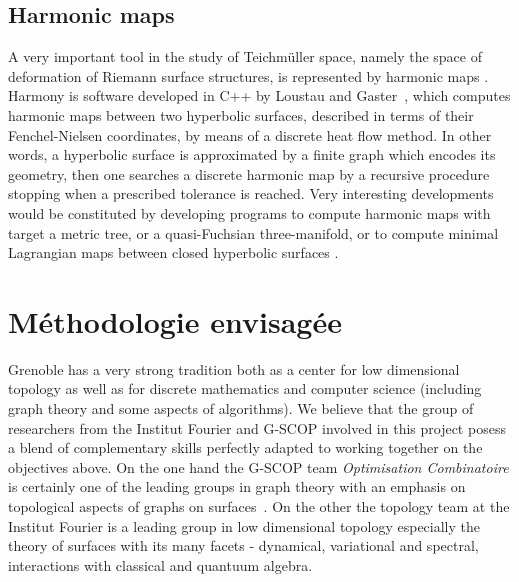 \documentclass[14pt,fleqn]{article}
\begin{document}
\subsection{Harmonic maps}

A very important tool in the study of Teichm\" {u}ller space, namely the
space of deformation of Riemann surface structures, is represented by
harmonic maps \cite{wolf}. Harmony is  software developed in C++ by
Loustau and Gaster~\cite{glm-cdehm-18}, which computes harmonic maps between two
hyperbolic surfaces, described in terms of their Fenchel-Nielsen
coordinates, by means of a discrete heat flow method. In other words,
a hyperbolic surface is 
approximated by a finite graph 
which encodes its geometry, 
then one searches a discrete harmonic 
map by a  recursive procedure 
stopping when  a prescribed tolerance is reached. 
Very interesting developments would be
constituted by developing programs to compute harmonic maps with
target a metric tree, or a quasi-Fuchsian three-manifold, or to
compute minimal Lagrangian maps between closed hyperbolic surfaces \cite{BS}.


\section{Méthodologie envisagée}

Grenoble  has 
a very strong tradition both 
as a center for low dimensional topology 
as well as for discrete mathematics and computer science
(including graph theory and some aspects of algorithms). 
We believe that the group of researchers from the Institut Fourier and G-SCOP 
involved
in this project posess a blend of complementary skills 
perfectly adapted
to working together on the objectives above.
On the one hand the G-SCOP team \emph{Optimisation Combinatoire} is certainly one of the leading groups in graph theory with an emphasis on topological aspects of graphs on surfaces~\cite{es-wqpp-18}. On the other the topology team at the Institut Fourier is a leading group in low dimensional topology 
especially the theory of surfaces 
with its many facets 
- dynamical, variational and spectral,
 interactions with classical and quantuum algebra.
 
\end{document}
